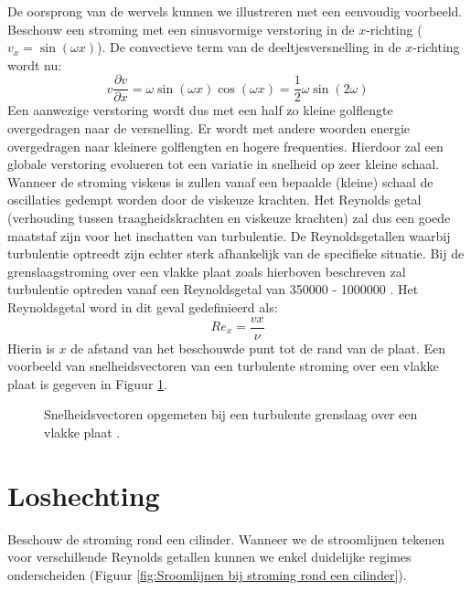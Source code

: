 De oorsprong van de wervels kunnen we illustreren met een eenvoudig voorbeeld. Beschouw een stroming met een sinusvormige verstoring in de $x$-richting ($v_x = \sin(\omega x)$). De convectieve term van de deeltjesversnelling in de $x$-richting wordt nu:
\begin{equation}
	v \frac{\partial v}{\partial x} = \omega \sin(\omega x) \cos(\omega x) = \frac{1}{2} \omega \sin( 2 \omega) 
\end{equation}
Een aanwezige verstoring wordt dus met een half zo kleine golflengte overgedragen naar de versnelling. Er wordt met andere woorden energie overgedragen naar kleinere golflengten en hogere frequenties. Hierdoor zal een globale verstoring evolueren tot een variatie in snelheid op zeer kleine schaal. Wanneer de stroming viskeus is zullen vanaf een bepaalde (kleine) schaal de oscillaties gedempt worden door de viskeuze krachten. Het Reynolds getal (verhouding tussen traagheidskrachten en viskeuze krachten) zal dus een goede maatstaf zijn voor het inschatten van turbulentie. De Reynoldsgetallen waarbij turbulentie optreedt zijn echter sterk afhankelijk van de specifieke situatie. Bij de grenslaagstroming over een vlakke plaat zoals hierboven beschreven zal turbulentie optreden vanaf een Reynoldsgetal van 350000 - 1000000 \cite{Schlichting1979}. Het Reynoldsgetal word in dit geval gedefinieerd als:
\begin{equation}
	Re_x = \frac{v x}{\nu}
\end{equation}
Hierin is $x$ de afstand van het beschouwde punt tot de rand van de plaat. Een voorbeeld van snelheidsvectoren van een turbulente stroming over een vlakke plaat is gegeven in Figuur \ref{fig:Turbulente grenslaag voorbeeld}.
\begin{figure}[htb]
	\centering
	
	\caption{Snelheidsvectoren opgemeten bij een turbulente grenslaag over een vlakke plaat \cite{Tomkins1997}.}
	\label{fig:Turbulente grenslaag voorbeeld}
\end{figure}

	\section{Loshechting}
	\label{sec:Loshechting}
	
Beschouw de stroming rond een cilinder. Wanneer we de stroomlijnen tekenen voor verschillende Reynolds getallen kunnen we enkel duidelijke regimes onderscheiden (Figuur \ref{fig:Sroomlijnen bij stroming rond een cilinder}).

